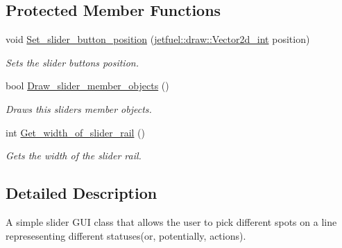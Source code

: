 \subsection*{Protected Member Functions}
\begin{DoxyCompactItemize}
\item 
void \hyperlink{classjetfuel_1_1gui_1_1Slider_ae0b83862beb7f631145fd3c9dddfb661}{Set\+\_\+slider\+\_\+button\+\_\+position} (\hyperlink{classjetfuel_1_1draw_1_1Vector2d}{jetfuel\+::draw\+::\+Vector2d\+\_\+int} position)
\begin{DoxyCompactList}\small\item\em Sets the slider button\textquotesingle{}s position. \end{DoxyCompactList}\item 
bool \hyperlink{classjetfuel_1_1gui_1_1Slider_a730d18fe513120406907380b7caf3280}{Draw\+\_\+slider\+\_\+member\+\_\+objects} ()
\begin{DoxyCompactList}\small\item\em Draws this slider\textquotesingle{}s member objects. \end{DoxyCompactList}\item 
int \hyperlink{classjetfuel_1_1gui_1_1Slider_a4115f54db7955a6493661ec176b532fd}{Get\+\_\+width\+\_\+of\+\_\+slider\+\_\+rail} ()
\begin{DoxyCompactList}\small\item\em Gets the width of the slider rail. \end{DoxyCompactList}\end{DoxyCompactItemize}


\subsection{Detailed Description}
A simple slider G\+UI class that allows the user to pick different spots on a line represesenting different statuses(or, potentially, actions).

